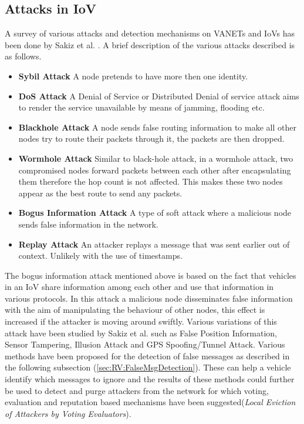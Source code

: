 \documentclass[journal]{IEEEtran}
\begin{document}
\subsection{Attacks in IoV}
\label{sec:RV:attacks}
A survey of various attacks and detection mechanisms on VANETs and IoVs has been done by Sakiz et al. \cite{c:AttacksSurvey}. A brief description of the various attacks described is as follows.
\begin{itemize}
	\item \textbf{Sybil Attack} A node pretends to have more then one identity.
	\item \textbf{DoS Attack} A Denial of Service or Distributed Denial of service attack aims to render the service unavailable by means of jamming, flooding etc.
	\item \textbf{Blackhole Attack} A node sends false routing information to make all other nodes try to route their packets through it, the packets are then dropped.
	\item \textbf{Wormhole Attack} Similar to black-hole attack, in a wormhole attack, two compromised nodes forward packets between each other after encapsulating them therefore the hop count is not affected. This makes these two nodes appear as the best route to send any packets.
	\item \textbf{Bogus Information Attack} A type of soft attack where a malicious node sends false information in the network.
	\item \textbf{Replay Attack} An attacker replays a message that was sent earlier out of context. Unlikely with the use of timestamps.
\end{itemize}
The bogus information attack mentioned above is based on the fact that vehicles in an IoV share information among each other and use that information in various protocols. In this attack a malicious node disseminates false information with the aim of manipulating the behaviour of other nodes, this effect is increased if the attacker is moving around swiftly\cite{c:MotorwayAttack}. Various variations of this attack have been studied by Sakiz et al.\cite{c:AttacksSurvey} such as False Position Information\cite{c:FalsePositionInformation}, Sensor Tampering, Illusion Attack\cite{c:IllusionAttack} and GPS Spoofing/Tunnel Attack\cite{c:TunnelAttack}. Various methods have been proposed for the detection of false messages as described in the following subsection (\ref{sec:RV:FalseMsgDetection}). These can help a vehicle identify which messages to ignore and the results of these methods could further be used to detect and purge attackers from the network for which voting, evaluation and reputation based mechanisms have been suggested\cite{c:MDSandLEAVE}(\textit{Local Eviction of Attackers by Voting Evaluators})\cite{c:messagefilterCoE}. 
\end{document}
